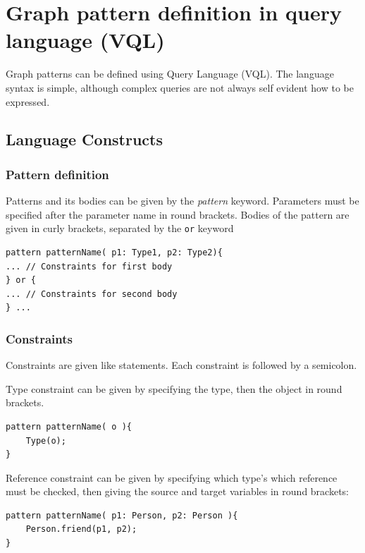 \chapter{Graph pattern definition in \viatra{} query language (VQL)}
\label{chapter:vql}

Graph patterns can be defined using \viatra{} Query Language (VQL). 
The language syntax is simple, although complex queries are not always self evident how to be expressed.

\section{ Language Constructs }

\subsection{Pattern definition}
Patterns and its bodies can be given by the \emph{pattern} keyword. 
Parameters must be specified after the parameter name in round brackets. 
Bodies of the pattern are given in curly brackets, separated by the \texttt{or} keyword

\begin{minipage}{\textwidth}
\begin{lstlisting}[language=vql]
pattern patternName( p1: Type1, p2: Type2){
... // Constraints for first body
} or {
... // Constraints for second body
} ...
\end{lstlisting}
\end{minipage}


\subsection{Constraints}
Constraints are given like statements. 
Each constraint is followed by a semicolon.

\vspace{\abovedisplayskip}
\begin{minipage}{\textwidth}
Type constraint can be given by specifying the type, then the object in round brackets.
\begin{lstlisting}[language=vql]
pattern patternName( o ){
	Type(o);
}
\end{lstlisting}
\end{minipage}
\vspace{\belowdisplayskip}

\begin{minipage}{\textwidth}
Reference constraint can be given by specifying which type's which reference must be checked, then giving the source and target variables in round brackets:
\begin{lstlisting}[language=vql]
pattern patternName( p1: Person, p2: Person ){
	Person.friend(p1, p2);
}
\end{lstlisting}
\end{minipage}
\vspace{\belowdisplayskip}

